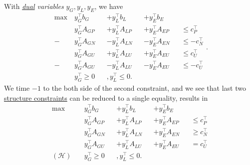 With \emph{\hyperref[def:dual]{dual} variables} \(y_G, y_L, y_E\), we have
\[
	\begin{alignedat}{4}
		\max~ & y^{\top}_G b_G &&+ y^{\top}_L b_L &&+ y^{\top}_E b_E                     \\
		& y^{\top}_G A_{GP} &&+ y^{\top}_L A_{LP} &&+ y^{\top}_E A_{EP} &&\leq c^{\top}_P   \\
		-& y^{\top}_G A_{GN} &&- y^{\top}_L A_{LN} &&- y^{\top}_E A_{EN} &&\leq -c^{\top}_N \\
		& y^{\top}_G A_{GU} &&+ y^{\top}_L A_{LU} &&+ y^{\top}_E A_{EU} &&\leq c^{\top}_U   \\
		-& y^{\top}_G A_{GU} &&- y^{\top}_L A_{LU} &&- y^{\top}_E A_{EU} &&\leq -c^{\top}_U \\
		&y^{\top}_G \geq 0&&, y^{\top}_L\leq 0.
	\end{alignedat}.
\]
We time \(-1\) to the both side of the second constraint, and we see that last two \hyperref[def:structured-constraints]{structure constraints} can be reduced to a
single equality, results in
\[
	\begin{alignedat}{4}
		\max~ & y^{\top}_G b_G &&+ y^{\top}_L b_L &&+ y^{\top}_E b_E                     \\
		& y^{\top}_G A_{GP} &&+ y^{\top}_L A_{LP} &&+ y^{\top}_E A_{EP} &&\leq c^{\top}_P   \\
		& y^{\top}_G A_{GN} &&+ y^{\top}_L A_{LN} &&+ y^{\top}_E A_{EN} &&\geq c^{\top}_N \\
		& y^{\top}_G A_{GU} &&+ y^{\top}_L A_{LU} &&+ y^{\top}_E A_{EU} && = c^{\top}_U     \\
		(\mathcal{H})\quad &y^{\top}_G \geq 0&&, y^{\top}_L\leq 0.
	\end{alignedat}
\]

